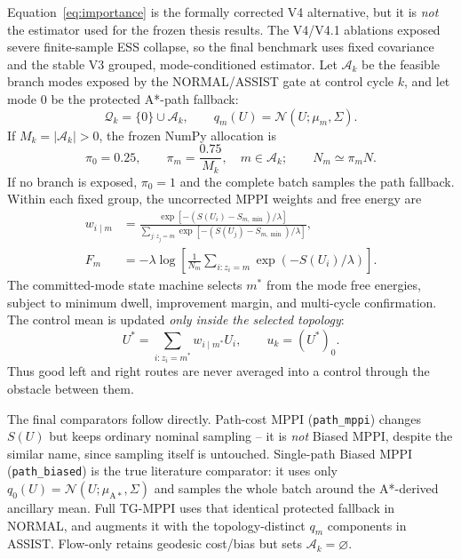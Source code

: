 \documentclass[11pt,a4paper]{article}
\newcommand{\N}{\mathcal{N}}
\begin{document}
Equation~\eqref{eq:importance} is the formally corrected V4 alternative, but
it is \emph{not} the estimator used for the frozen thesis results. The V4/V4.1
ablations exposed severe finite-sample ESS collapse, so the final benchmark
uses fixed covariance and the stable V3 grouped, mode-conditioned estimator.
Let $\mathcal A_k$ be the feasible branch modes exposed by the NORMAL/ASSIST
gate at control cycle $k$, and let mode $0$ be the protected A*-path fallback:
\begin{equation}
  \mathcal Q_k=\{0\}\cup\mathcal A_k,
  \qquad q_m(U)=\N(U;\mu_m,\Sigma).
\end{equation}
If $M_k=|\mathcal A_k|>0$, the frozen NumPy allocation is
\begin{equation}
  \pi_0=0.25,
  \qquad
  \pi_m=\frac{0.75}{M_k},\quad m\in\mathcal A_k;
  \qquad N_m\simeq\pi_mN.
  \label{eq:frozen-allocation}
\end{equation}
If no branch is exposed, $\pi_0=1$ and the complete batch samples the path
fallback. Within each fixed group, the uncorrected MPPI weights and free energy
are
\begin{align}
  w_{i\mid m}
  &=\frac{\exp[-(S(U_i)-S_{m,\min})/\lambda]}
          {\sum_{j:z_j=m}\exp[-(S(U_j)-S_{m,\min})/\lambda]},\\
  F_m
  &=-\lambda\log\!\left[
       \frac{1}{N_m}\sum_{i:z_i=m}\exp(-S(U_i)/\lambda)
     \right].
  \label{eq:frozen-mode-evidence}
\end{align}
The committed-mode state machine selects $m^*$ from the mode free energies,
subject to minimum dwell, improvement margin, and multi-cycle confirmation.
The control mean is updated \emph{only inside the selected topology}:
\begin{equation}
  U^*=\sum_{i:z_i=m^*}w_{i\mid m^*}U_i,
  \qquad u_k=(U^*)_0.
  \label{eq:frozen-selected-update}
\end{equation}
Thus good left and right routes are never averaged into a control through the
obstacle between them.

The final comparators follow directly. Path-cost MPPI (\texttt{path\_mppi})
changes $S(U)$ but keeps ordinary nominal sampling -- it is \emph{not} Biased
MPPI, despite the similar name, since sampling itself is untouched.
Single-path Biased MPPI (\texttt{path\_biased}) is the true literature
comparator: it uses only $q_0(U)=\N(U;\mu_{\mathrm{A*}},\Sigma)$ and samples
the whole batch around the A*-derived ancillary mean. Full TG-MPPI uses that identical protected fallback
in NORMAL, and augments it with the topology-distinct $q_m$ components in
ASSIST. Flow-only retains geodesic cost/bias but sets $\mathcal A_k=\varnothing$.
\end{document}

